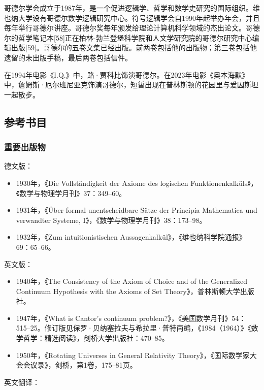 哥德尔学会成立于1987年，是一个促进逻辑学、哲学和数学史研究的国际组织。维也纳大学设有哥德尔数学逻辑研究中心。符号逻辑学会自1990年起举办年会，并且每年举行哥德尔讲座。哥德尔奖每年颁发给理论计算机科学领域的杰出论文。哥德尔的哲学笔记本[58]正在柏林-勃兰登堡科学院和人文学研究院的哥德尔研究中心编辑出版[59]。哥德尔的五卷文集已经出版。前两卷包括他的出版物；第三卷包括他遗留的未出版手稿，最后两卷包括信件。

在1994年电影《I.Q.》中，路·贾科比饰演哥德尔。在2023年电影《奥本海默》中，詹姆斯·厄尔班尼亚克饰演哥德尔，短暂出现在普林斯顿的花园里与爱因斯坦一起散步。
\subsection{参考书目}  
\subsubsection{重要出版物}  
德文版：  
\begin{itemize}
\item 1930年，《Die Vollständigkeit der Axiome des logischen Funktionenkalküls》，《数学与物理学月刊》37：349–60。  
\item 1931年，《Über formal unentscheidbare Sätze der Principia Mathematica und verwandter Systeme, I》，《数学与物理学月刊》38：173–98。  
\item 1932年，《Zum intuitionistischen Aussagenkalkül》，《维也纳科学院通报》69：65–66。
\end{itemize}  
英文版：  
\begin{itemize}
\item 1940年，《The Consistency of the Axiom of Choice and of the Generalized Continuum Hypothesis with the Axioms of Set Theory》，普林斯顿大学出版社。  
\item 1947年，《What is Cantor's continuum problem?》，《美国数学月刊》54：515–25。修订版见保罗·贝纳塞拉夫与希拉里·普特南编，《1984（1964）》《数学哲学：精选阅读》，剑桥大学出版社：470–85。  
\item 1950年，《Rotating Universes in General Relativity Theory》，《国际数学家大会会议录》，剑桥，第1卷，175–81页。 
\end{itemize} 
英文翻译：  

